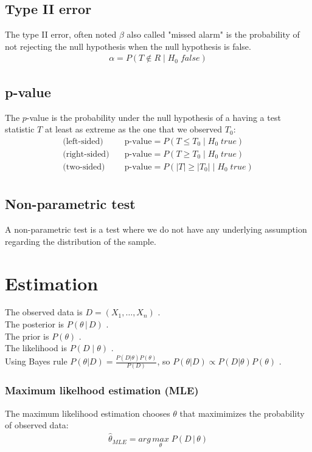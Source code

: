 \documentclass[../main.tex]{subfiles}
\begin{document}
\subsection{Type II error}
The type II error, often noted $\beta$ also called "missed alarm" is the probability
of not rejecting the null hypothesis when the null hypothesis is false.
\begin{align*}
    \alpha = P(T \notin R\; |\; H_0\; false)
\end{align*}

\subsection{p-value}
The $p$-value is the probability under the null hypothesis of a having a test statistic $T$ at
least as extreme as the one that we observed $T_0$:
\begin{align*}
    \text{(left-sided)} \quad & \text{p-value} = P(T \leq T_0\; |\; H_0\; true) \\
    \text{(right-sided)}\quad & \text{p-value} = P(T \geq T_0\; |\; H_0\; true) \\
    \text{(two-sided)}  \quad & \text{p-value} = P(|T| \geq |T_0|\; |\; H_0\; true) \\
\end{align*}

\subsection{Non-parametric test}
A non-parametric test is a test where we do not have any underlying assumption regarding the
distribution of the sample.

\section{Estimation}
The observed data is $D = (X_1, \dots, X_n)$ . \\
The posterior is $P(\theta\, | \, D)$ . \\
The prior is $P(\theta)$ . \\
The likelihood is $P(D\; |\; \theta)$ . \\
Using Bayes rule $P(\theta | D) = \frac{P(D|\theta)P(\theta)}{P(D)}$,
so $P(\theta | D) \propto P(D|\theta)P(\theta)$ .

\subsubsection{Maximum likelhood estimation (MLE)}
 The maximum likelihood estimation chooses $\theta$ that maximimizes the probability of observed data:
\begin{align*}
    \hat{\theta}_{MLE} = arg\,\underset{\theta}{max}\; P(D\,|\, \theta)
\end{align*}
\end{document}
